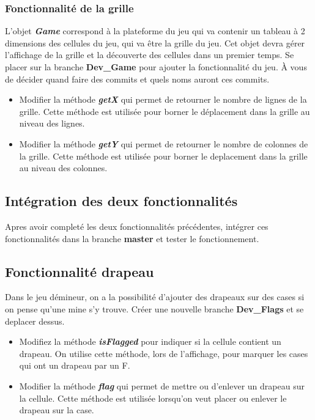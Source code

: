 \subsubsection{Fonctionnalité de la grille}
\noindent L'objet \textit{\textbf{Game}} correspond à la plateforme du jeu qui va contenir un tableau à 2 dimensions des cellules du jeu, qui va être la grille du jeu. Cet objet devra gérer l'affichage de la grille et la découverte des cellules dans un premier temps. Se placer sur la branche \textbf{Dev\_Game} pour ajouter la fonctionnalité du jeu. À vous de décider quand faire des commits et quels noms auront ces commits.

\medskip

\begin{itemize}
    \item Modifier la méthode \textit{\textbf{getX}} qui permet de retourner le nombre de lignes de la grille. Cette méthode est utilisée pour borner le déplacement dans la grille au niveau des lignes.
    \medskip
    \item Modifier la méthode \textit{\textbf{getY}} qui permet de retourner le nombre de colonnes de la grille. Cette méthode est utilisée pour borner le deplacement dans la grille au niveau des colonnes.
\end{itemize}
\noindent 

\medskip

\subsection{Intégration des deux fonctionnalités}
\noindent Apres avoir completé les deux fonctionnalités précédentes, intégrer ces fonctionnalités dans la branche \textbf{master} et tester le fonctionnement.

\subsection{Fonctionnalité drapeau}
Dans le jeu démineur, on a la possibilité d'ajouter des drapeaux sur des cases si on pense qu'une mine s'y trouve. Créer une nouvelle branche \textbf{Dev\_Flags} et se deplacer dessus.

\begin{itemize}
    \item Modifiez la méthode \textit{\textbf{isFlagged}} pour indiquer si la cellule contient un drapeau. On utilise cette méthode, lors de l'affichage, pour marquer les cases qui ont un drapeau par un F.
    \item Modifier la méthode \textit{\textbf{flag}} qui permet de mettre ou d'enlever un drapeau sur la cellule. Cette méthode est utilisée lorsqu'on veut placer ou enlever le drapeau sur la case.
\end{itemize}

